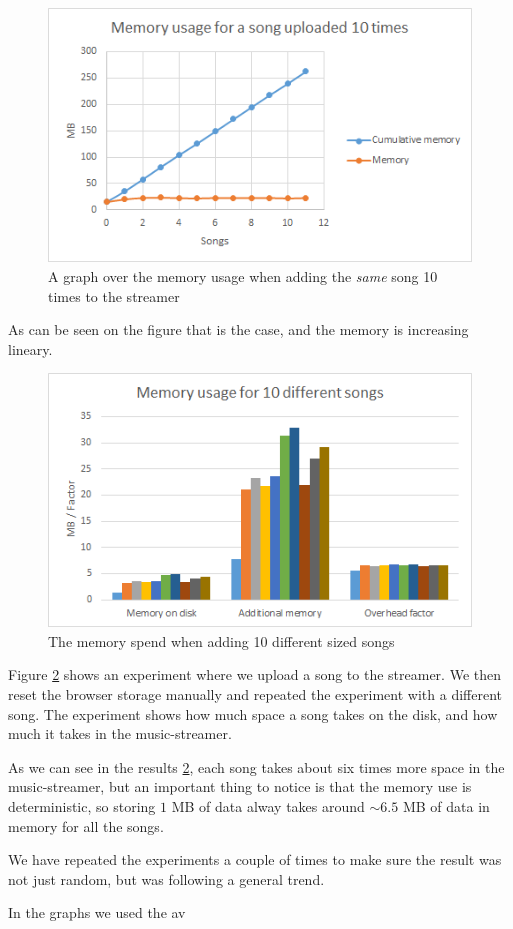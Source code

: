 \begin{figure}[H]
	\centering
	\includegraphics[scale=0.9]{gfx/memoryUsage}
    \caption{A graph over the memory usage when adding the {\em same} song 10 times to the streamer}
	\label{fig:memoryUsage}
\end{figure}
\noindent
As can be seen on the figure that is the case, and the memory is increasing lineary.

\begin{figure}[H]
	\centering
	\includegraphics[scale=0.9]{gfx/memoryDiffSize}
	\caption{The memory spend when adding 10 different sized songs}
	\label{fig:memoryDiffSizes}
\end{figure}
\noindent
Figure \ref{fig:memoryDiffSizes} shows an experiment where we upload a song to the streamer. 
We then reset the browser storage manually and repeated the experiment with a different song.
The experiment shows how much space a song takes on the disk,
and how much it takes in the music-streamer.

As we can see in the results \ref{fig:memoryDiffSizes},
each song takes about six times more space in the music-streamer, 
but an important thing to notice is that the memory use is deterministic,
so storing $1$ MB of data alway takes around $\sim6.5$ MB of data in memory for all the songs.

We have repeated the experiments a couple of times to make sure the result was not just random, 
but was following a general trend. 

In the graphs we used the av
